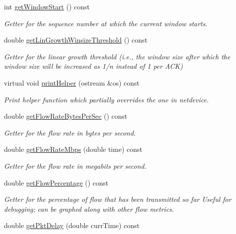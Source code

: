 \begin{DoxyCompactItemize}
int \hyperlink{classnetflow_a7c44701ace1f15dbef9227fb06f419af}{get\-Window\-Start} () const 
\begin{DoxyCompactList}\small\item\em Getter for the sequence number at which the current window starts. \end{DoxyCompactList}\item 
double \hyperlink{classnetflow_a7b2904e3229ddb7baba23c1c2abd4941}{get\-Lin\-Growth\-Winsize\-Threshold} () const 
\begin{DoxyCompactList}\small\item\em Getter for the linear growth threshold (i.\-e., the window size after which the window size will be increased as 1/n instead of 1 per A\-C\-K) \end{DoxyCompactList}\item 
virtual void \hyperlink{classnetflow_acbcb512e7ba8fb2f4dfb5c49f792b837}{print\-Helper} (ostream \&os) const 
\begin{DoxyCompactList}\small\item\em Print helper function which partially overrides the one in netdevice. \end{DoxyCompactList}\item 
double \hyperlink{classnetflow_a2f30ed4c8b1934dc70cad568b009384b}{get\-Flow\-Rate\-Bytes\-Per\-Sec} () const 
\begin{DoxyCompactList}\small\item\em Getter for the flow rate in bytes per second. \end{DoxyCompactList}\item 
double \hyperlink{classnetflow_a8e05bddc18878c14b815dba199996aa0}{get\-Flow\-Rate\-Mbps} (double time) const 
\begin{DoxyCompactList}\small\item\em Getter for the flow rate in megabits per second. \end{DoxyCompactList}\item 
double \hyperlink{classnetflow_ade54f5be8b44ca85de0f1b453857519d}{get\-Flow\-Percentage} () const 
\begin{DoxyCompactList}\small\item\em Getter for the percentage of flow that has been transmitted so far Useful for debugging; can be graphed along with other flow metrics. \end{DoxyCompactList}\item 
double \hyperlink{classnetflow_af9eaf8bcc1f369201b400ca8ffa98f34}{get\-Pkt\-Delay} (double curr\-Time) const 

\end{DoxyCompactItemize}
